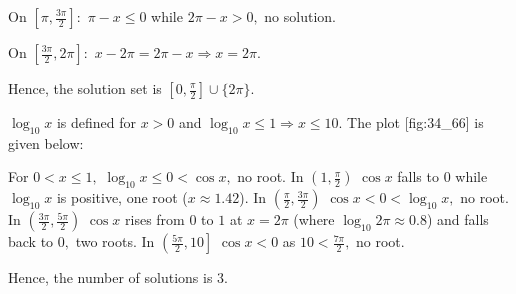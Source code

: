   On $\left[\pi, \frac{3\pi}{2}\right]:$ $\pi - x\leq 0$ while $2\pi - x > 0,$ no solution.

  On $\left[\frac{3\pi}{2}, 2\pi\right]:$ $x - 2\pi = 2\pi - x\Rightarrow x = 2\pi.$

  Hence, the solution set is $\left[0, \frac{\pi}{2}\right]\cup\{2\pi\}.$

\item $\log_{10}x$ is defined for $x > 0$ and $\log_{10}x\leq 1\Rightarrow x\leq 10.$ The plot [fig:34_66]
  is given below:

  \startplacefigure[title={Plot of $\cos x$ and $\log_{10}x$}, reference=fig:34_66]
    \externalfigure[34_66.pdf]
  \stopplacefigure

  For $0 < x\leq 1,$ $\log_{10}x\leq 0 < \cos x,$ no root. In $\left(1, \frac{\pi}{2}\right)$ $\cos x$ falls to $0$
  while $\log_{10}x$ is positive, one root ($x\approx 1.42$). In $\left(\frac{\pi}{2}, \frac{3\pi}{2}\right)$ $\cos x <
  0 < \log_{10}x,$ no root. In $\left(\frac{3\pi}{2}, \frac{5\pi}{2}\right)$ $\cos x$ rises from $0$ to $1$ at $x =
  2\pi$ (where $\log_{10}2\pi\approx 0.8$) and falls back to $0,$ two roots. In $\left(\frac{5\pi}{2}, 10\right]$ $\cos
  x < 0$ as $10 < \frac{7\pi}{2},$ no root.

  Hence, the number of solutions is $3.$

\stopitemize
